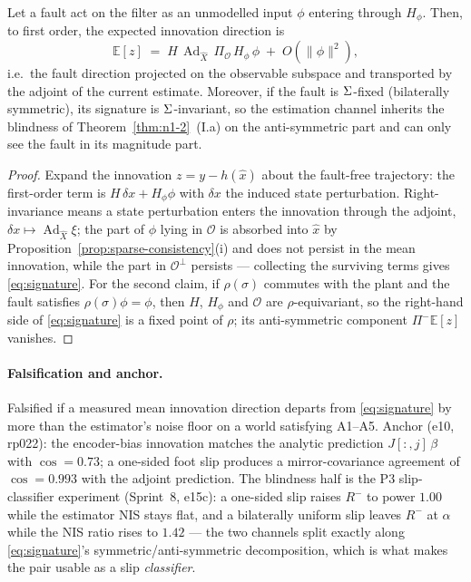 \begin{proposition}[Signature = observable projection, adjoint-transported]
\label{prop:signature}
Let a fault act on the filter as an unmodelled input $\phi$ entering through
$H_\phi$. Then, to first order, the expected innovation direction is
\begin{equation}
  \label{eq:signature}
  \mathbb{E}[z] \;=\; H\,\operatorname{Ad}_{\hat X}\,\Pi_{\mathcal{O}}\,H_\phi\, \phi \;+\; O(\|\phi\|^2),
\end{equation}
i.e.\ the fault direction projected on the observable subspace and transported
by the adjoint of the current estimate. Moreover, if the fault is
$\Sigma$-fixed (bilaterally symmetric), its signature is $\Sigma$-invariant,
so the estimation channel inherits the blindness of Theorem~\ref{thm:n1-2}~(I.a)
on the anti-symmetric part and can only see the fault in its magnitude part.
\end{proposition}

\begin{proof}
Expand the innovation $z = y - h(\hat x)$ about the fault-free trajectory:
the first-order term is $H\,\delta x + H_\phi\phi$ with $\delta x$ the induced
state perturbation. Right-invariance means a state perturbation enters the
innovation through the adjoint, $\delta x \mapsto \operatorname{Ad}_{\hat X}\xi$; the part of
$\phi$ lying in $\mathcal{O}$ is absorbed into $\hat x$ by
Proposition~\ref{prop:sparse-consistency}(i) and does not persist in the mean
innovation, while the part in $\mathcal{O}^\perp$ persists --- collecting the
surviving terms gives \eqref{eq:signature}. For the second claim, if
$\rho(\sigma)$ commutes with the plant and the fault satisfies
$\rho(\sigma)\phi = \phi$, then $H$, $H_\phi$ and $\mathcal{O}$ are
$\rho$-equivariant, so the right-hand side of \eqref{eq:signature} is a fixed
point of $\rho$; its anti-symmetric component $\Pi^-\mathbb{E}[z]$ vanishes.
\end{proof}

\paragraph{Falsification and anchor.}
Falsified if a measured mean innovation direction departs from
\eqref{eq:signature} by more than the estimator's noise floor on a world
satisfying A1--A5. Anchor (e10, rp022): the encoder-bias innovation matches the
analytic prediction $J[:,j]\,\beta$ with $\cos = 0.73$; a one-sided foot slip
produces a mirror-covariance agreement of $\cos = 0.993$ with the adjoint
prediction. The blindness half is the P3 slip-classifier experiment (Sprint~8,
e15c): a one-sided slip raises $R^-$ to power $1.00$ while the estimator NIS
stays flat, and a bilaterally uniform slip leaves $R^-$ at $\alpha$ while the
NIS ratio rises to $1.42$ --- the two channels split exactly along
\eqref{eq:signature}'s symmetric/anti-symmetric decomposition, which is what
makes the pair usable as a slip \emph{classifier}.


